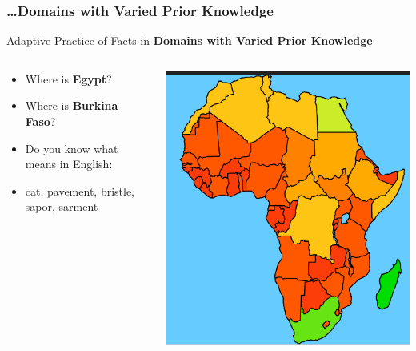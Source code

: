 \documentclass[xcolor=svgnames]{beamer}
\begin{document}
\begin{frame}
	\frametitle{\ldots Domains with Varied Prior Knowledge}
       Adaptive Practice of Facts in \textbf{Domains with Varied Prior Knowledge}
  \begin{columns}
   \begin{column}{.49\textwidth}
      \begin{itemize}
        \item Where is \textbf{Egypt}?
        \item Where is \textbf{Burkina Faso}?
        \\
        \item Do you know what means in English:
        \item cat, pavement, bristle, sapor, sarment
        \
      \end{itemize}
    \end{column}
    \begin{column}{.49\textwidth}
       \includegraphics[width=\textwidth]{img/knowledge-map.png}
    \end{column}
  \end{columns}
\end{frame}
\end{document}

